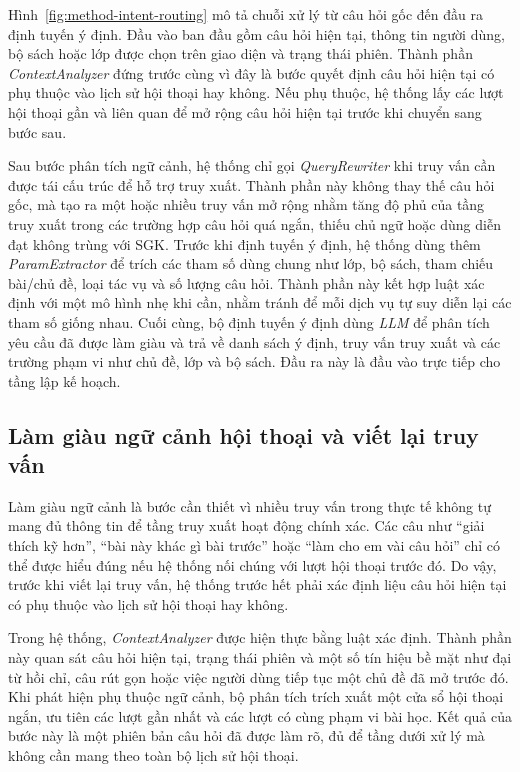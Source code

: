 \documentclass[../DoAn.tex]{subfiles}
\begin{document}
Hình~\ref{fig:method-intent-routing} mô tả chuỗi xử lý từ câu hỏi gốc đến đầu ra định tuyến ý định. Đầu vào ban đầu gồm câu hỏi hiện tại, thông tin người dùng, bộ sách hoặc lớp được chọn trên giao diện và trạng thái phiên. Thành phần \textit{ContextAnalyzer} đứng trước cùng vì đây là bước quyết định câu hỏi hiện tại có phụ thuộc vào lịch sử hội thoại hay không. Nếu phụ thuộc, hệ thống lấy các lượt hội thoại gần và liên quan để mở rộng câu hỏi hiện tại trước khi chuyển sang bước sau.

Sau bước phân tích ngữ cảnh, hệ thống chỉ gọi \textit{QueryRewriter} khi truy vấn cần được tái cấu trúc để hỗ trợ truy xuất. Thành phần này không thay thế câu hỏi gốc, mà tạo ra một hoặc nhiều truy vấn mở rộng nhằm tăng độ phủ của tầng truy xuất trong các trường hợp câu hỏi quá ngắn, thiếu chủ ngữ hoặc dùng diễn đạt không trùng với SGK. Trước khi định tuyến ý định, hệ thống dùng thêm \textit{ParamExtractor} để trích các tham số dùng chung như lớp, bộ sách, tham chiếu bài/chủ đề, loại tác vụ và số lượng câu hỏi. Thành phần này kết hợp luật xác định với một mô hình nhẹ khi cần, nhằm tránh để mỗi dịch vụ tự suy diễn lại các tham số giống nhau. Cuối cùng, bộ định tuyến ý định dùng \textit{LLM} để phân tích yêu cầu đã được làm giàu và trả về danh sách ý định, truy vấn truy xuất và các trường phạm vi như chủ đề, lớp và bộ sách. Đầu ra này là đầu vào trực tiếp cho tầng lập kế hoạch.

\subsection{Làm giàu ngữ cảnh hội thoại và viết lại truy vấn}

Làm giàu ngữ cảnh là bước cần thiết vì nhiều truy vấn trong thực tế không tự mang đủ thông tin để tầng truy xuất hoạt động chính xác. Các câu như ``giải thích kỹ hơn'', ``bài này khác gì bài trước'' hoặc ``làm cho em vài câu hỏi'' chỉ có thể được hiểu đúng nếu hệ thống nối chúng với lượt hội thoại trước đó. Do vậy, trước khi viết lại truy vấn, hệ thống trước hết phải xác định liệu câu hỏi hiện tại có phụ thuộc vào lịch sử hội thoại hay không.

Trong hệ thống, \textit{ContextAnalyzer} được hiện thực bằng luật xác định. Thành phần này quan sát câu hỏi hiện tại, trạng thái phiên và một số tín hiệu bề mặt như đại từ hồi chỉ, câu rút gọn hoặc việc người dùng tiếp tục một chủ đề đã mở trước đó. Khi phát hiện phụ thuộc ngữ cảnh, bộ phân tích trích xuất một cửa sổ hội thoại ngắn, ưu tiên các lượt gần nhất và các lượt có cùng phạm vi bài học. Kết quả của bước này là một phiên bản câu hỏi đã được làm rõ, đủ để tầng dưới xử lý mà không cần mang theo toàn bộ lịch sử hội thoại.
\end{document}
